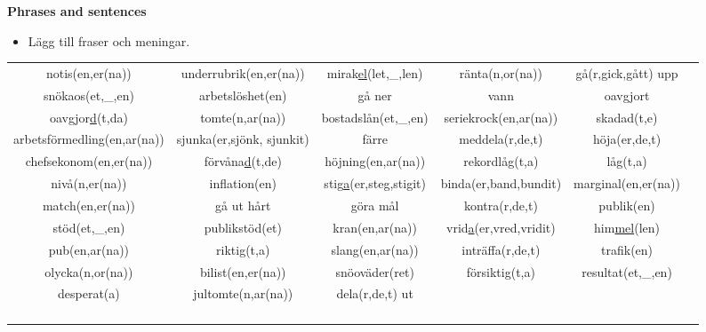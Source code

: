 
\begin{flushleft}
    \textbf{Phrases and sentences}
    \begin{itemize}
        \item Lägg till fraser och meningar.
    \end{itemize}
\end{flushleft}

\begin{center}
    \begin{adjustwidth}{-2.45cm}{}
        \begin{tabular}{|c c c c c c|}
            \hline
            notis(en,er(na)) & underrubrik(en,er(na)) & mirak\underline{el}(let,\_,len) & ränta(n,or(na)) & gå(r,gick,gått) upp &  \\
            snökaos(et,\_,en) & arbetslöshet(en) & gå ner & vann & oavgjort & \\
            oavgjor\underline{d}(t,da) & tomte(n,ar(na)) & bostadslån(et,\_,en) & seriekrock(en,ar(na)) & skadad(t,e) & \\
            arbetsförmedling(en,ar(na)) & sjunka(er,sjönk, sjunkit) & färre & meddela(r,de,t) & höja(er,de,t) & \\
            chefsekonom(en,er(na)) & förvåna\underline{d}(t,de) & höjning(en,ar(na)) & rekordlåg(t,a) & låg(t,a) &  \\
            nivå(n,er(na)) & inflation(en) & stig\underline{a}(er,steg,stigit) & binda(er,band,bundit) & marginal(en,er(na)) &  \\
            match(en,er(na)) & gå ut hårt & göra mål & kontra(r,de,t) & publik(en) &  \\
            stöd(et,\_,en) & publikstöd(et) & kran(en,ar(na)) & vrid\underline{a}(er,vred,vridit) & him\underline{mel}(len) &  \\
            pub(en,ar(na)) & riktig(t,a) & slang(en,ar(na)) & inträffa(r,de,t) & trafik(en) &  \\
            olycka(n,or(na)) & bilist(en,er(na)) & snöoväder(ret) & försiktig(t,a) & resultat(et,\_,en) &  \\
            desperat(a) & jultomte(n,ar(na)) & dela(r,de,t) ut &  &  &  \\
             &  &  &  &  &  \\
             &  &  &  &  &  \\
             &  &  &  &  &  \\
             &  &  &  &  &  \\

\end{tabular}
\end{adjustwidth}
\end{center}
